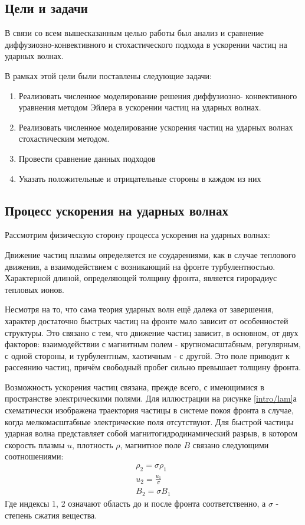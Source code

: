 \documentclass[a4paper,14pt]{extarticle} %
\begin{document}
\subsection{Цели и задачи}
В связи со всем вышесказанным целью работы был анализ и сравнение \\
диффузиозно-конвективного и стохастического подхода в ускорении частиц на ударных волнах.

В рамках этой цели были поставлены следующие задачи:
\begin{enumerate}
\item Реализовать численное моделирование решения диффузиозно- конвективного уравнения методом Эйлера в ускорении частиц на ударных волнах.
\item Реализовать численное моделирование ускорения частиц на ударных волнах стохастическим методом.
\item Провести сравнение данных подходов
\item Указать положительные и отрицательные стороны в каждом из них
\end{enumerate}

\subsection{Процесс ускорения на ударных волнах}
Рассмотрим физическую сторону процесса ускорения на ударных волнах\cite{berezhko}:

Движение частиц плазмы определяется не соударениями, как в случае теплового движения, а взаимодействием с возникающий на фронте турбулентностью. Характерной длиной, определяющей толщину фронта, является гирорадиус тепловых ионов.

Несмотря на то, что сама теория ударных волн ещё далека от завершения, характер достаточно быстрых частиц на фронте мало зависит от особенностей структуры. Это связано с тем, что движение частиц зависит, в основном, от двух факторов: взаимодействии с магнитным полем - крупномасштабным, регулярным, с одной стороны, и турбулентным, хаотичным - с другой. Это поле приводит к рассеянию частиц, причём свободный пробег сильно превышает толщину фронта.

Возможность ускорения частиц связана, прежде всего, с имеющимися в пространстве электрическими полями. Для иллюстрации на рисунке \ref{intro/lam}а схематически изображена траектория частицы в системе покоя фронта в случае, когда мелкомасштабные электрические поля отсутствуют. Для быстрой частицы ударная волна представляет собой магнитогидродинамический разрыв, в котором скорость плазмы $u$, плотность $\rho$, магнитное поле $B$ связано следующими соотношениями:
\begin{eqnarray}
\rho_2 = \sigma \rho_1\\
u_2=\frac{u_1}{\sigma}\\
B_2=\sigma B_1
\end{eqnarray}
Где индексы 1, 2 означают область до и после фронта соответственно, а $\sigma$ - степень сжатия вещества.
\end{document}
